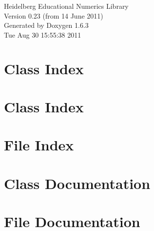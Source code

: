 \documentclass[a4paper]{book}
\begin{document}
\hypersetup{pageanchor=false}
\begin{titlepage}
\vspace*{7cm}
\begin{center}
{\Large Heidelberg Educational Numerics Library \\[1ex]\large Version 0.23 (from 14 June 2011) }\\
\vspace*{1cm}
{\large Generated by Doxygen 1.6.3}\\
\vspace*{0.5cm}
{\small Tue Aug 30 15:55:38 2011}\\
\end{center}
\end{titlepage}
\clearemptydoublepage
{}
\tableofcontents
\clearemptydoublepage
{}
\hypersetup{pageanchor=true}
\chapter{Class Index}

\chapter{Class Index}

\chapter{File Index}

\chapter{Class Documentation}





































\chapter{File Documentation}











\printindex
\end{document}

